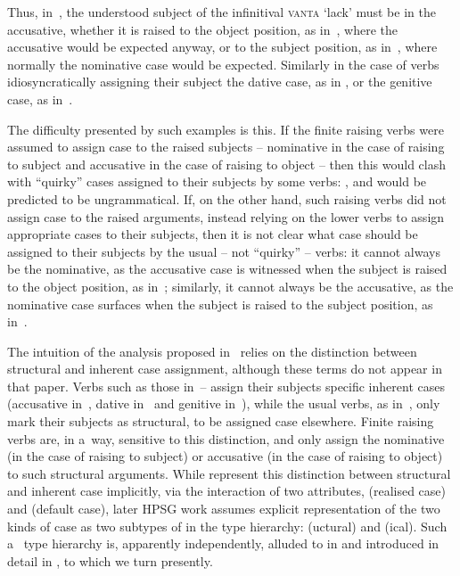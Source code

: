 \documentclass[output=paper]{langsci/langscibook}
\begin{document}
Thus, in~, the understood subject of the infinitival \textsc{vanta} ‘lack’ must be in the accusative, whether it is raised to the object position, as in~, where the accusative would be expected anyway, or to the subject position, as in~, where normally the nominative case would be expected.  Similarly in the case of verbs idiosyncratically assigning their subject the dative case, as in , or the genitive case, as in~.

The difficulty presented by such examples is this. If the finite raising verbs were assumed to assign case to the raised subjects – nominative in the case of raising to subject and accusative in the case of raising to object – then this would clash with “quirky” cases assigned to their subjects by some verbs: ,  and  would be predicted to be ungrammatical.  If, on the other hand, such raising verbs did not assign case to the raised arguments, instead relying on the lower verbs to assign appropriate cases to their subjects, then it is not clear what case should be assigned to their subjects by the usual – not “quirky” – verbs: it cannot always be the nominative, as the accusative case is witnessed when the subject is raised to the object position, as in~; similarly, it cannot always be the accusative, as the nominative case surfaces when the subject is raised to the subject position, as in~.

The intuition of the analysis proposed in~\citealt{SKG92} relies on the distinction between structural and inherent case assignment, although these terms do not appear in that paper.  Verbs such as those in~– assign their subjects specific inherent cases (accusative in~, dative in~ and genitive in~), while the usual verbs, as in~, only mark their subjects as structural, to be assigned case elsewhere.  Finite raising verbs are, in a~way, sensitive to this distinction, and only assign the nominative (in the case of raising to subject) or accusative (in the case of raising to object) to such structural arguments.  While \citet{SKG92} represent this distinction between structural and inherent case implicitly, via the interaction of two attributes,  (realised case) and  (default case), later HPSG work assumes explicit representation of the two kinds of case as two subtypes of  in the type hierarchy: (uctural) and (ical).  Such a~ type hierarchy is, apparently independently, alluded to in \citealt{Pollard94a} and introduced in detail in \citealt{HM94a}, to which we turn presently.
\end{document}
